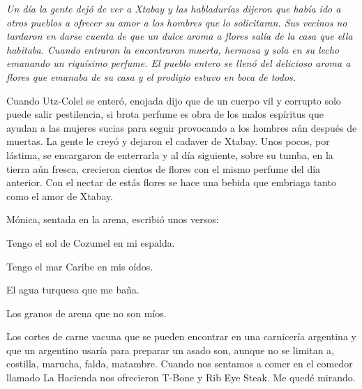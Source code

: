 \documentclass[12pt,twoside,openright,a5paper]{book}
\begin{document}
{\em Un día la gente dejó de ver a Xtabay y las habladurías dijeron
que había ido a otros pueblos a ofrecer su amor a los hombres que lo
solicitaran. Sus vecinos no tardaron en darse cuenta de que un dulce aroma
a flores salía de la casa que ella habitaba. Cuando entraron la encontraron
muerta, hermosa y sola en su lecho emanando un riquísimo perfume. El pueblo
entero se llenó del delicioso aroma a flores que emanaba de su casa y el
prodigio estuvo en boca de todos.

Cuando Utz-Colel se enteró, enojada dijo que de un cuerpo vil y corrupto solo
puede salir pestilencia, si brota perfume es obra de los malos espíritus
que ayudan a las mujeres sucias para seguir provocando a los hombres aún
después de muertas. La gente le creyó y dejaron el cadaver de Xtabay. Unos
pocos, por lástima, se encargaron de enterrarla y al día siguiente,
sobre su tumba, en la tierra aún fresca, crecieron cientos de flores con
el mismo perfume del día anterior. Con el nectar de estás flores se hace
una bebida que embriaga tanto como el amor de Xtabay.}


\vspace{0.5cm}
\hrulefill\hspace{0.2cm} \decofourleft\decofourright \hspace{0.2cm} \hrulefill
\vspace{0.5cm}

Mónica, sentada en la arena, escribió unos versos: 

\vspace{0.5cm}

Tengo el sol de Cozumel en mi espalda.

Tengo el mar Caribe en mis oídos.

El agua turquesa que me baña.

Los granos de arena que no son míos.


\vspace{0.5cm}
\hrulefill\hspace{0.2cm} \decofourleft\decofourright \hspace{0.2cm} \hrulefill
\vspace{0.5cm}

Los cortes de carne vacuna que se pueden encontrar en una carnicería
argentina y que un argentino usaría para preparar un asado son, aunque
no se limitan a, costilla, marucha, falda, matambre. Cuando nos sentamos
a comer en el comedor llamado La Hacienda nos ofrecieron T-Bone y Rib Eye
Steak. Me quedé mirando.
\end{document}
